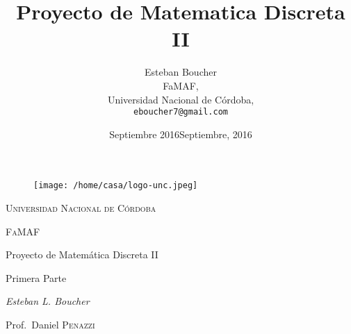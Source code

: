 \documentclass[12pt,a4paper]{report}
\begin{document}
\begin{titlepage}
	\centering

	\begin{figure}[htp]
	\centering
	\texttt{[image: /home/casa/logo-unc.jpeg]}
	\end{figure}
	
	{\scshape\Large\textsc{Universidad Nacional de Córdoba} \par}
	\vspace{0.5cm}
	{\scshape\large FaMAF\par}
	\vspace{1.5cm}

	\title{Proyecto de Matematica Discreta II}

	{\LARGE Proyecto de Matemática Discreta II\par}
	\vspace{1cm}
	{\Large Primera Parte\par}
	\vspace{3cm}
	{\Large\itshape Esteban L. Boucher}
	\author{Esteban Boucher\\
	  FaMAF,\\
	  Universidad Nacional de Córdoba,\\
	\texttt{eboucher7@gmail.com}}
	\date{Septiembre 2016}
	\maketitle
	\vfill
	Prof.~Daniel \textsc{Penazzi}

	\date{Septiembre, 2016}
\end{titlepage}
\end{document}
